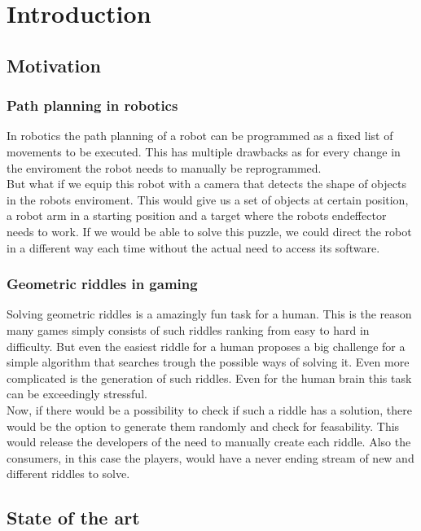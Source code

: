 \chapter{Introduction}
\label{cha:Introduction}

\section{Motivation}
\label{sec:Motivation}
\subsection{Path planning in robotics}
In robotics the path planning of a robot can be programmed as a fixed list of movements to be executed. This has multiple drawbacks as for every change in the enviroment the robot needs to manually be reprogrammed.\\
But what if we equip this robot with a camera that detects the shape of objects in the robots enviroment. This would give us a set of objects at certain position, a robot arm in a starting position and a target where the robots endeffector needs to work. If we would be able to solve this puzzle, we could direct the robot in a different way each time without the actual need to access its software.


\subsection{Geometric riddles in gaming}
Solving geometric riddles is a amazingly fun task for a human. This is the reason many games simply consists of such riddles ranking from easy to hard in difficulty. But even the easiest riddle for a human proposes a big challenge for a simple algorithm that searches trough the possible ways of solving it. Even more complicated is the generation of such riddles. Even for the human brain this task can be exceedingly stressful.\\
 Now, if there would be a possibility to check if such a riddle has a solution, there would be the option to generate them randomly and check for feasability. This would release the developers of the need to manually create each riddle. Also the consumers, in this case the players, would have a never ending stream of new and different riddles to solve.

\section{State of the art}
